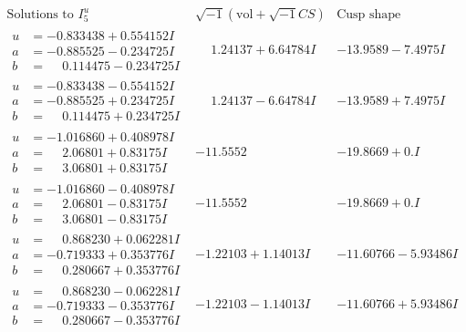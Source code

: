\documentclass[1p]{elsarticle_modified}
\theoremstyle{definition}
\newcommand{\I}{\sqrt{-1}}
\begin{document}
$$\begin{array}{c|c|c}  
\text{Solutions to }I^u_{5}& \I (\text{vol} + \sqrt{-1}CS) & \text{Cusp shape}\\
 \hline 
\begin{aligned}
u &= -0.833438 + 0.554152 I \\
a &= -0.885525 - 0.234725 I \\
b &= \phantom{-}0.114475 - 0.234725 I\end{aligned}
 & \phantom{-}1.24137 + 6.64784 I & -13.9589 - 7.4975 I \\ \hline\begin{aligned}
u &= -0.833438 - 0.554152 I \\
a &= -0.885525 + 0.234725 I \\
b &= \phantom{-}0.114475 + 0.234725 I\end{aligned}
 & \phantom{-}1.24137 - 6.64784 I & -13.9589 + 7.4975 I \\ \hline\begin{aligned}
u &= -1.016860 + 0.408978 I \\
a &= \phantom{-}2.06801 + 0.83175 I \\
b &= \phantom{-}3.06801 + 0.83175 I\end{aligned}
 & -11.5552\phantom{ +0.000000I} & -19.8669 + 0. I\phantom{ +0.000000I} \\ \hline\begin{aligned}
u &= -1.016860 - 0.408978 I \\
a &= \phantom{-}2.06801 - 0.83175 I \\
b &= \phantom{-}3.06801 - 0.83175 I\end{aligned}
 & -11.5552\phantom{ +0.000000I} & -19.8669 + 0. I\phantom{ +0.000000I} \\ \hline\begin{aligned}
u &= \phantom{-}0.868230 + 0.062281 I \\
a &= -0.719333 + 0.353776 I \\
b &= \phantom{-}0.280667 + 0.353776 I\end{aligned}
 & -1.22103 + 1.14013 I & -11.60766 - 5.93486 I \\ \hline\begin{aligned}
u &= \phantom{-}0.868230 - 0.062281 I \\
a &= -0.719333 - 0.353776 I \\
b &= \phantom{-}0.280667 - 0.353776 I\end{aligned}
 & -1.22103 - 1.14013 I & -11.60766 + 5.93486 I \\ \hline\begin{aligned}

\end{aligned}
\end{array}$$
\end{document}
